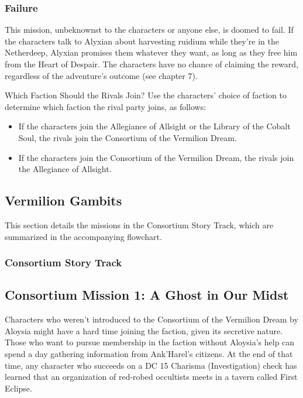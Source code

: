 \documentclass[10pt,a4paper,twoside,fancy,bg=print,twocolumn,openany,nodeprecatedcode]{dndbook}
\begin{document}
\subsubsection{Failure}
This mission, unbeknownst to the characters or anyone else, is doomed to fail. If the characters talk to Alyxian about harvesting ruidium while they're in the Netherdeep, Alyxian promises them whatever they want, as long as they free him from the Heart of Despair. The characters have no chance of claiming the reward, regardless of the adventure's outcome (see chapter 7).

\begin{DndSidebar}[float=!b]{Which Faction Should the Rivals Join?}
Use the characters' choice of faction to determine which faction the rival party joins, as follows:




\begin{itemize}
\item If the characters join the Allegiance of Allsight or the Library of the Cobalt Soul, the rivals join the Consortium of the Vermilion Dream.
\item If the characters join the Consortium of the Vermilion Dream, the rivals join the Allegiance of Allsight.
\end{itemize}



\end{DndSidebar}

\subsection{Vermilion Gambits}
This section details the missions in the Consortium Story Track, which are summarized in the accompanying flowchart.

\subsubsection{Consortium Story Track}
\subsection{Consortium Mission 1: A Ghost in Our Midst}
Characters who weren't introduced to the Consortium of the Vermilion Dream by Aloysia might have a hard time joining the faction, given its secretive nature. Those who want to pursue membership in the faction without Aloysia's help can spend a day gathering information from Ank'Harel's citizens. At the end of that time, any character who succeeds on a DC 15 Charisma (Investigation) check has learned that an organization of red-robed occultists meets in a tavern called First Eclipse.
\end{document}
